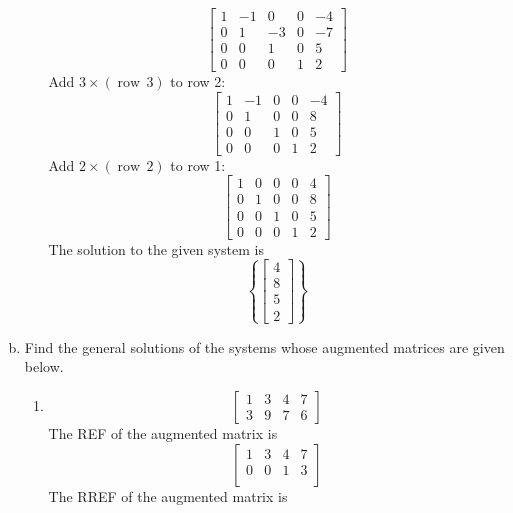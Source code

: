 \begin{enumerate}[(a)]
\begin{enumerate}[i]
        \[
        \left[\begin{array}{cccc|c}
        1 & -1 & 0 & 0 & -4 \\
        0 & 1 & -3 & 0 & -7 \\
        0 & 0 & 1 & 0 & 5 \\
        0 & 0 & 0 & 1 & 2
        \end{array}\right]
        \]
        Add $3 \times(\operatorname{row}\,3)$ to row 2:
        \[
        \left[\begin{array}{cccc|c}
        1 & -1 & 0 & 0 & -4 \\
        0 & 1 & 0 & 0 & 8 \\
        0 & 0 & 1 & 0 & 5 \\
        0 & 0 & 0 & 1 & 2
        \end{array}\right]
        \]
        Add $2 \times(\operatorname{row}\,2)$ to row 1:
        \[
        \left[\begin{array}{cccc|c}
        1 & 0 & 0 & 0 & 4
        \\
        0 & 1 & 0 & 0 & 8 \\
        0 & 0 & 1 & 0 & 5 \\
        0 & 0 & 0 & 1 & 2
        \end{array}\right]
        \]
        The solution to the given system is
        $$
        \left\{\begin{bmatrix*}4 \\ 8 \\ 5 \\ 2\end{bmatrix*}\right\}
        $$
    \end{enumerate}
    \item
    Find the general solutions of the systems whose augmented matrices are given below.
    \begin{enumerate}[i]
        \item
        $$\left[\begin{array}{ccc|c}1 & 3 & 4 & 7 \\ 3 & 9 & 7 & 6\end{array}\right]$$
        The REF of the augmented matrix is
        $$
        \left[
            \begin{array}{ccc|c}
             1 & 3 & 4 & 7 \\
             0 & 0 & 1 & 3 \\
            \end{array}
        \right]
        $$
        The RREF of the augmented matrix is
        $$
$$
\end{enumerate}
\end{enumerate}
